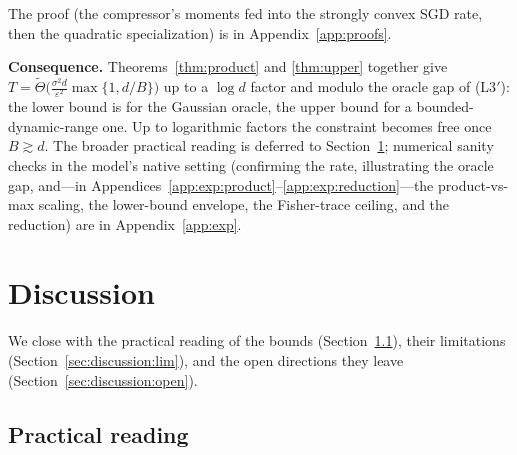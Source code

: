 \documentclass[11pt]{article}
\theoremstyle{definition}
\newcommand{\eps}{\varepsilon}
\begin{document}
\noindent The proof (the compressor's moments fed into the strongly convex SGD rate, then the quadratic
specialization) is in Appendix~\ref{app:proofs}.

\noindent\textbf{Consequence.} Theorems~\ref{thm:product} and \ref{thm:upper} together give
$T=\widetilde\Theta\!\big(\tfrac{\sigma^2 d}{\eps^2}\max\{1,d/B\}\big)$ up to a $\log d$ factor and
modulo the oracle gap of (L3$'$): the lower bound is for the Gaussian oracle, the upper bound for a
bounded-dynamic-range one. Up to logarithmic factors the constraint becomes free once $B\gtrsim d$.
The broader practical reading is deferred to Section~\ref{sec:discussion}; numerical sanity checks in
the model's native setting (confirming the rate, illustrating the oracle gap, and---in
Appendices~\ref{app:exp:product}--\ref{app:exp:reduction}---the product-vs-max scaling, the lower-bound
envelope, the Fisher-trace ceiling, and the reduction) are in Appendix~\ref{app:exp}.

\section{Discussion}
\label{sec:discussion}

We close with the practical reading of the bounds (Section~\ref{sec:discussion:reading}),
their limitations (Section~\ref{sec:discussion:lim}), and the open directions they leave
(Section~\ref{sec:discussion:open}).

\subsection{Practical reading}
\label{sec:discussion:reading}
\end{document}
